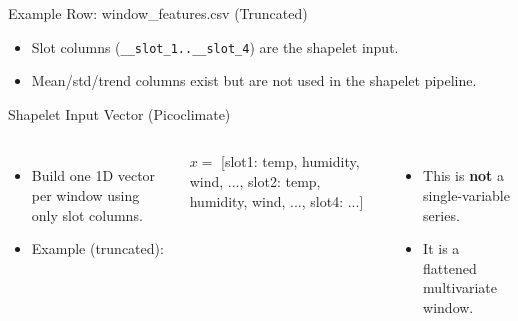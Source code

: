 \documentclass[aspectratio=169]{beamer}
\begin{document}
\begin{frame}{Example Row: window\_features.csv (Truncated)}
\scriptsize
{}
\vspace{6pt}
\begin{itemize}\footnotesize\setlength\itemsep{4pt}
  \item Slot columns (\texttt{\_\_slot\_1..\_\_slot\_4}) are the shapelet input.
  \item Mean/std/trend columns exist but are not used in the shapelet pipeline.
\end{itemize}
\end{frame}

\begin{frame}{Shapelet Input Vector (Picoclimate)}
\begin{columns}[T,onlytextwidth]
  \begin{itemize}\footnotesize\setlength\itemsep{4pt}
    \item Build one 1D vector per window using only slot columns.
    \item Example (truncated):
  \end{itemize}
  \vspace{2pt}
  \begin{tcolorbox}[enhanced,boxrule=1pt,arc=2pt,colback=clight,colframe=cmid]
    \scriptsize
    $x =$ [slot1: temp, humidity, wind, ...,
    slot2: temp, humidity, wind, ..., slot4: ...]
  \end{tcolorbox}
  \begin{itemize}\footnotesize\setlength\itemsep{4pt}
    \item This is \textbf{not} a single-variable series.
    \item It is a flattened multivariate window.
  \end{itemize}
\end{columns}
\end{frame}
\end{document}
